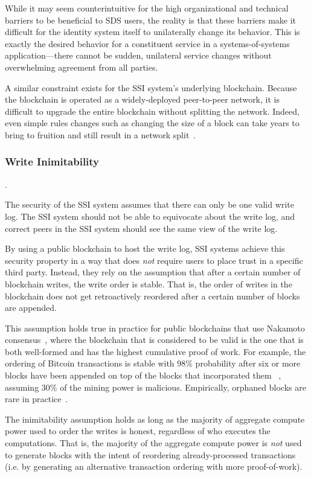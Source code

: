 While it may seem counterintuitive for the high organizational and technical
barriers to be beneficial to SDS users, the reality is that these barriers
make it difficult for the identity system itself to unilaterally change its
behavior.  This is exactly the desired behavior for a constituent service in a
systems-of-systems application---there cannot be sudden,
unilateral service changes without overwhelming agreement from all parties.

A similar constraint exists for the SSI system's underlying blockchain.
Because the blockchain is operated as a widely-deployed peer-to-peer network,
it is difficult to upgrade the entire blockchain without splitting the network.
Indeed, even simple rules changes such as changing the size of a block can take 
years to bring to fruition and still result in a network
split~\cite{bitcoin-cash-split}.

\subsubsection{Write Inimitability}.

The security of the SSI system assumes that there can only be one valid write
log.  The SSI system should not be able to equivocate about the write log, and
correct peers in the SSI system should see the same view of the write log.

By using a public blockchain to host the write log, SSI systems achieve
this security property in a way that does \emph{not} require users to place
trust in a specific third party.  Instead, they rely on the assumption that after a certain number
of blockchain writes, the write order is stable.  That is, the order of writes
in the blockchain does not get retroactively reordered after a certain number of
blocks are appended.

This assumption holds true in practice for public blockchains that use
Nakamoto consensus~\cite{bitcoin-pedigree}, where the blockchain that is
considered to be valid is the one that is both well-formed and has the highest
cumulative proof of work.  For example, the ordering of Bitcoin transactions
is stable with 98\% probability after six or more blocks have been appended on top of
the blocks that incorporated them
~\cite{bitcoin}, assuming 30\% of the mining power is malicious.
Empirically, orphaned blocks are rare in
practice~\cite{blockchain-info-orphan-rate}.

The inimitability assumption holds as long as the
majority of aggregate compute power used to order the writes is honest,
regardless of who executes the computations.  That is, the majority of the
aggregate compute power is \emph{not} used to generate blocks with the intent of
reordering already-processed transactions (i.e. by generating an alternative
transaction ordering with more proof-of-work).


